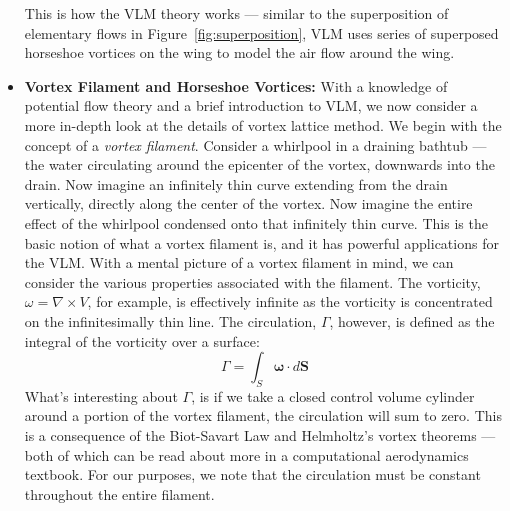 \documentclass{article}
\begin{document}
\begin{itemize}
This is how the VLM theory works --- similar to the superposition of elementary flows in Figure~\ref{fig:superposition}, VLM uses series of superposed horseshoe vortices on the wing to model the air flow around the wing. 
\item[] \textbf{Vortex Filament and Horseshoe Vortices:} With a knowledge of potential flow theory and a brief introduction to VLM, we now consider a more in-depth look at the details of vortex lattice method. We begin with the concept of a \textit{vortex filament}.
Consider a whirlpool in a draining bathtub --- the water circulating around the epicenter of the vortex, downwards into the drain. Now imagine an infinitely thin curve 
extending from the drain vertically, directly along the center of the vortex. Now imagine the entire effect of the whirlpool condensed onto that infinitely thin curve. 
This is the basic notion of what a vortex filament is, and it has powerful applications for the VLM.\@
With a mental picture of a vortex filament in mind, we can consider the various properties associated with the filament.
The vorticity, $\omega = \nabla \times V$, for example, is effectively infinite as the vorticity is concentrated on the infinitesimally thin line.
The circulation, $\Gamma$, however, is defined as the integral of the vorticity over a surface:
\begin{equation}\label{eq:filament_Gamma}
\Gamma = \int_{S}^{}\boldsymbol{\omega}\cdot d\boldsymbol{S}
\end{equation}
What's interesting about $\Gamma$, is if we take a closed control volume cylinder around a portion of the vortex filament, the circulation will sum to zero. This is a consequence of the Biot-Savart Law and Helmholtz's vortex theorems --- both of which can be read about more in a computational aerodynamics textbook. 
For our purposes, we note that the circulation must be constant throughout the entire filament. 


\end{itemize}
\end{document}
